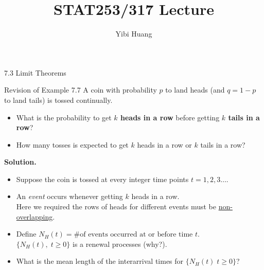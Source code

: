 \documentclass[letterpaper,handout]{beamer}
\title{STAT253/317 Lecture \chapnum} \date{} \author{Yibi Huang}
\begin{document}
\begin{frame}\maketitle\begin{center}7.3\; Limit Theorems\end{center}\end{frame}
\begin{frame}{Revision of Example 7.7}
A coin with probability $p$ to land heads (and $q=1-p$ to land tails) is tossed continually.
\begin{itemize}
\item What is the probability to get {\bf $k$ heads in a row} before getting {\bf $k$ tails in a row}?
\item How many tosses is expected to get $k$ heads in a row or $k$ tails in a row?
\end{itemize}\medskip

\textbf{Solution.}
\begin{itemize}
\item Suppose the coin is tossed at every integer time points $t=1,2,3\ldots.$
\item An {\em event} occurs whenever getting $k$ heads in a row.\\
Here we required the rows of heads for different events must be \underline{non-overlapping}.
\item Define
$N_H(t)=\mbox{\# of events occurred at or before time }t.$\\
$\{N_H(t),\; t\ge 0\}$ is a renewal processes (why?).
\item What is the mean length of the interarrival times for $\{N_H(t)\; t\ge 0\}$?
\end{itemize}
\end{frame}
\end{document}
